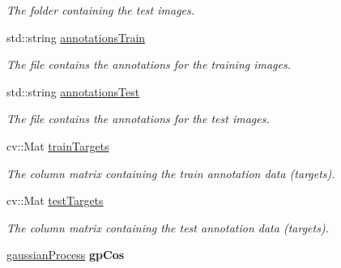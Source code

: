 \begin{DoxyCompactItemize}
\begin{DoxyCompactList}\small\item\em The folder containing the test images. \item\end{DoxyCompactList}\item 
\hypertarget{classclassifyImages_a7bfaf90f554b20da1af2371af3d44978}{
std::string \hyperlink{classclassifyImages_a7bfaf90f554b20da1af2371af3d44978}{annotationsTrain}}
\label{classclassifyImages_a7bfaf90f554b20da1af2371af3d44978}

\begin{DoxyCompactList}\small\item\em The file contains the annotations for the training images. \item\end{DoxyCompactList}\item 
\hypertarget{classclassifyImages_a6980fddf5eb36bf6793a00f24307236d}{
std::string \hyperlink{classclassifyImages_a6980fddf5eb36bf6793a00f24307236d}{annotationsTest}}
\label{classclassifyImages_a6980fddf5eb36bf6793a00f24307236d}

\begin{DoxyCompactList}\small\item\em The file contains the annotations for the test images. \item\end{DoxyCompactList}\item 
\hypertarget{classclassifyImages_ad5d2ac462795640203cc13c4d4c5d9d3}{
cv::Mat \hyperlink{classclassifyImages_ad5d2ac462795640203cc13c4d4c5d9d3}{trainTargets}}
\label{classclassifyImages_ad5d2ac462795640203cc13c4d4c5d9d3}

\begin{DoxyCompactList}\small\item\em The column matrix containing the train annotation data (targets). \item\end{DoxyCompactList}\item 
\hypertarget{classclassifyImages_a217fb270099a15dcccf13182fd6dd0e4}{
cv::Mat \hyperlink{classclassifyImages_a217fb270099a15dcccf13182fd6dd0e4}{testTargets}}
\label{classclassifyImages_a217fb270099a15dcccf13182fd6dd0e4}

\begin{DoxyCompactList}\small\item\em The column matrix containing the test annotation data (targets). \item\end{DoxyCompactList}\item 
\hypertarget{classclassifyImages_abff6b85e214c69747627c68c933bdb92}{
\hyperlink{classgaussianProcess}{gaussianProcess} {\bfseries gpCos}}
\label{classclassifyImages_abff6b85e214c69747627c68c933bdb92}


\end{DoxyCompactItemize}
